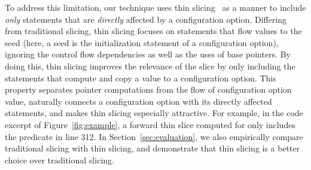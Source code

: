 

To address this limitation, our technique uses thin
slicing~\cite{Sridharan:2007} as a manner to include
\textit{only} statements that are \textit{directly} affected by a configuration option.
Differing from traditional slicing, thin slicing
focuses on statements that flow values to the seed (here, a
seed is the initialization statement of a configuration option), ignoring the 
control flow dependencies as well as the uses of
base pointers. By doing this, thin slicing improves the relevance
of the slice by only including the statements that compute
and copy a value to a configuration option.
This property separates
pointer computations from the flow of configuration option value,
naturally connects a configuration option with its
directly affected statements, and makes thin slicing
especially attractive.
For example, in the code excerpt of Figure~\ref{fig:example},
a forward thin slice computed for 
only includes the predicate in line 312.
In Section~\ref{sec:evaluation}, 
we also empirically compare traditional slicing with
thin slicing, and demonstrate that thin slicing is a better choice
over traditional slicing.




% 
